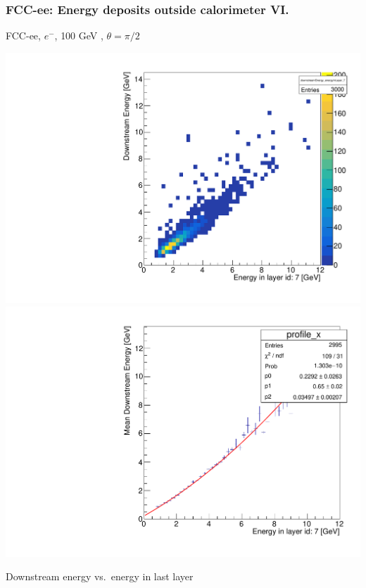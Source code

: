 \documentclass{beamer}
\newcommand{\redtext}[1]{%
  \textcolor{myRed}{#1}
}
\begin{document}
\begin{frame}
  \frametitle{FCC-ee: Energy deposits outside calorimeter VI.}

  \centering
  FCC-ee, $e^{-}$, \redtext{100 GeV}, $\theta = \pi/2$ \\[1.5ex]
  \begin{adjustwidth}{-9mm}{-9mm}
    \includegraphics[width=0.49\linewidth]{figures/downstream/hist_downstream_vs_layer_7_90deg_100GeV.pdf}
    \includegraphics[width=0.49\linewidth]{figures/downstream/profile_downstream_vs_layer_7_90deg_100GeV.pdf}
  \end{adjustwidth}
  \redtext{Downstream} energy vs.\ energy in last layer
\end{frame}
\end{document}
